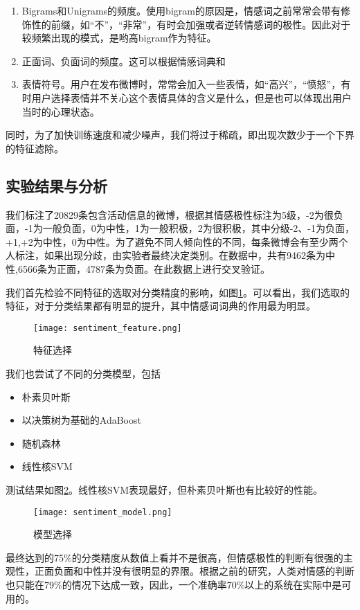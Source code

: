 \begin{enumerate}
\item Bigrams和Unigrams的频度。使用bigram的原因是，情感词之前常常会带有修饰性的前缀，如``不''，``非常''，有时会加强或者逆转情感词的极性。因此对于较频繁出现的模式，是哟高bigram作为特征。
\item 正面词、负面词的频度。这可以根据情感词典和
\item 表情符号。用户在发布微博时，常常会加入一些表情，如``高兴''，``愤怒''，有时用户选择表情并不关心这个表情具体的含义是什么，但是也可以体现出用户当时的心理状态。
\end{enumerate}
同时，为了加快训练速度和减少噪声，我们将过于稀疏，即出现次数少于一个下界的特征滤除。

\subsection{实验结果与分析}

我们标注了20829条包含活动信息的微博，根据其情感极性标注为5级，-2为很负面，-1为一般负面，0为中性，1为一般积极，2为很积极，其中分级-2、-1为负面，+1,+2为中性，0为中性。为了避免不同人倾向性的不同，每条微博会有至少两个人标注，如果出现分歧，由实验者最终决定类别。在数据中，共有9462条为中性,6566条为正面，4787条为负面。在此数据上进行交叉验证。

我们首先检验不同特征的选取对分类精度的影响，如图\ref{fig:sentiment_feature}。可以看出，我们选取的特征，对于分类结果都有明显的提升，其中情感词词典的作用最为明显。
\begin{figure}[!h]
\centering
\texttt{[image: sentiment\_feature.png]}
\caption{特征选择}
\label{fig:sentiment_feature}
\end{figure}

我们也尝试了不同的分类模型，包括
\begin{itemize}
\item 朴素贝叶斯
\item 以决策树为基础的AdaBoost
\item 随机森林
\item 线性核SVM
\end{itemize}
测试结果如图\ref{fig:sentiment_model}。线性核SVM表现最好，但朴素贝叶斯也有比较好的性能。

\begin{figure}[!h]
\centering
\texttt{[image: sentiment\_model.png]}
\caption{模型选择}
\label{fig:sentiment_model}
\end{figure}

最终达到的75\%的分类精度从数值上看并不是很高，但情感极性的判断有很强的主观性，正面负面和中性并没有很明显的界限。根据之前的研究，人类对情感的判断也只能在79\%的情况下达成一致，因此，一个准确率70\%以上的系统在实际中是可用的。

